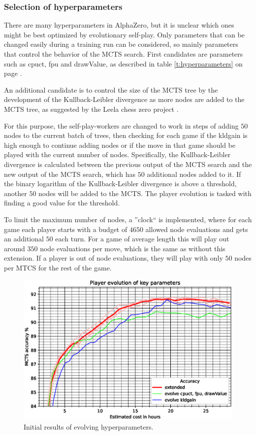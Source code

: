 \documentclass[12pt,onecolumn,oneside,titlepage]{article}
\begin{document}
\subsubsection{Selection of hyperparameters}

There are many hyperparameters in AlphaZero, but it is unclear which ones might be best optimized by evolutionary self-play. Only parameters that can be changed easily during a training run can be considered, so mainly parameters that control the behavior of the MCTS search.
First candidates are parameters such as cpuct, fpu and drawValue, as described in table \ref{t:hyperparameters} on page \pageref{t:hyperparameters}.

An additional candidate is to control the size of the MCTS tree by the development of the Kullback-Leibler divergence as more nodes are added to the MCTS tree, as suggested by the Leela chess zero project \cite{leela0kldgain}. 

For this purpose, the self-play-workers are changed to work in steps of adding $50$ nodes to the current batch of trees,
then checking for each game if the kldgain is high enough to continue adding nodes or if the move in that game should be played with the current number of nodes.
Specifically, the Kullback-Leibler divergence is calculated between the previous output of the MCTS search and the new output of the MCTS search, which has $50$ additional nodes added to it.
If the binary logarithm of the Kullback-Leibler divergence is above a threshold, another $50$ nodes will be added to the MCTS. The player evolution is tasked with finding a good value for the threshold.

To limit the maximum number of nodes, a ''clock`` is implemented, where for each game each player starts with a budget of $4650$ allowed node evaluations and gets an additional $50$ each turn.
For a game of average length this will play out around $350$ node evaluations per move, which is the same as without this extension. If a player is out of node evaluations, they will play with only $50$ nodes per MTCS for the rest of the game.


\begin{figure}[H]
\centering
\includegraphics[clip,width=\columnwidth]{evolve_results}
\caption{Initial results of evolving hyperparameters.}
\label{fig:evolve_results}
\end{figure}
\end{document}
